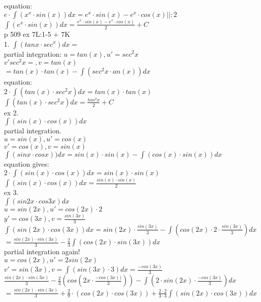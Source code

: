 \documentclass{article}
\begin{document}
  equation:\\
  $e\cdot\int(x^x\cdot sin(x))dx=e^x\cdot sin(x)-e^x\cdot cos(x) ||:2$\\
  $\int(e^x\cdot sin(x))dx=\frac{e^x\cdot sin(x)-e^x\cdot cos(x)}{2}+C$\\
  p 509 ex 7L:1-5 + 7K\\
  1. $\int (tan x\cdot sec^x)dx=$\\
  partial integration: $u=tan(x), u'=sec^2x$\\
  $v'sec^2x=,v=tan(x)$\\
  $=tan(x)\cdot tan(x)-\int(sec^2x\cdot an(x))dx$\\
  equation:\\
  $2\cdot \int (tan(x)\cdot sec^2x)dx=tan(x)\cdot tan(x)$\\
  $\int( tan(x) \cdot sec^2x)dx=\frac{tan^2x}{2}+C$\\
  ex 2.\\
  $\int( sin(x)\cdot cos(x))dx$\\
  partial integration.\\
  $u=sin(x), u'=cos(x)$\\
  $v'=cos(x), v=sin(x)$\\
  $\int (sin x\cdot cos x))dx=sin(x)\cdot sin(x)-\int(cos(x)\cdot sin(x))dx$\\
  equation gives:\\
  $2\cdot \int(sin(x)\cdot cos(x))dx=sin (x)\cdot sin(x)$ \\
  $\int(sin(x)\cdot cos(x))dx=\frac{sin(x)\cdot sin(x)}{2}$\\
  ex 3.\\
  $\int (sin2x\cdot cos3x)dx$\\
  $u=sin(2x), u'=cos(2x)\cdot2$\\
  $y'=cos(3x), v=\frac{sin(3x)}{3}$\\
  $\int (sin(2x)\cdot cos(3x))dx=sin(2x)\cdot\frac{sin(3x)}{3}-\int(cos(2x)\cdot 2\cdot\frac{sin(3x)}{3})dx$\\
  $=\frac{sin(2x)\cdot sin(3x)}{3}-\frac{2}{3}\int (cos (2x)\cdot sin(3x))dx$\\
  partial integration again!\\
  $u=cos(2x), u'=2sin(2x)$\\
  $v'=sin(3x), v=\int(sin (3x)\cdot 3)dx=\frac{-cos(3x)}{3}$\\
  $\frac{sin(2x)\cdot sin(3x)}{3}-\frac{2}{3}(cos(2x\cdot \frac{-cos(3x))}{3}))- \int(2\cdot sin(2x)\cdot \frac{-cos(3x)}{3})dx$\\
  $=\frac{sin(2x)\cdot sin(3x)}{3}+\frac{2}{9}\cdot (cos(2x)\cdot cos(3x))+\frac{2\cdot2}{3\cdot3}\int(sin(2x)\cdot cos(3x))dx$\\
\end{document}
